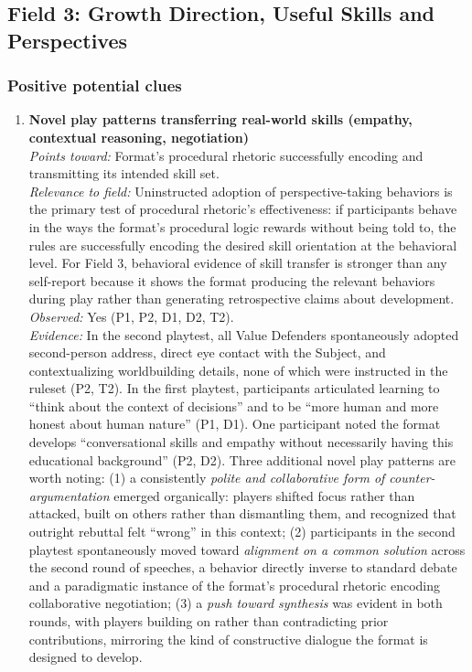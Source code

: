 \documentclass[12pt]{article}
\begin{document}
\bigskip

\subsection*{Field 3: Growth Direction, Useful Skills and Perspectives}

\subsubsection*{Positive potential clues}

\begin{enumerate}

\item \textbf{Novel play patterns transferring real-world skills (empathy, contextual reasoning, negotiation)}\\
\textit{Points toward:} Format's procedural rhetoric successfully encoding and transmitting its intended skill set.\\
\textit{Relevance to field:} Uninstructed adoption of perspective-taking behaviors is the primary test of procedural rhetoric's effectiveness: if participants behave in the ways the format's procedural logic rewards without being told to, the rules are successfully encoding the desired skill orientation at the behavioral level. For Field 3, behavioral evidence of skill transfer is stronger than any self-report because it shows the format producing the relevant behaviors during play rather than generating retrospective claims about development.\\
\textit{Observed:} Yes (P1, P2, D1, D2, T2).\\
\textit{Evidence:} In the second playtest, all Value Defenders spontaneously adopted second-person address, direct eye contact with the Subject, and contextualizing worldbuilding details, none of which were instructed in the ruleset (P2, T2). In the first playtest, participants articulated learning to ``think about the context of decisions'' and to be ``more human and more honest about human nature'' (P1, D1). One participant noted the format develops ``conversational skills and empathy without necessarily having this educational background'' (P2, D2). Three additional novel play patterns are worth noting: (1) a consistently \textit{polite and collaborative form of counter-argumentation} emerged organically: players shifted focus rather than attacked, built on others rather than dismantling them, and recognized that outright rebuttal felt ``wrong'' in this context; (2) participants in the second playtest spontaneously moved toward \textit{alignment on a common solution} across the second round of speeches, a behavior directly inverse to standard debate and a paradigmatic instance of the format's procedural rhetoric encoding collaborative negotiation; (3) a \textit{push toward synthesis} was evident in both rounds, with players building on rather than contradicting prior contributions, mirroring the kind of constructive dialogue the format is designed to develop.\\

\end{enumerate}
\end{document}
